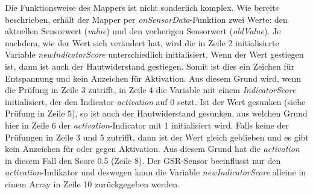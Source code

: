 Die Funktionsweise des Mappers ist nicht sonderlich komplex. Wie bereits beschrieben, erhält der Mapper per \textit{onSensorData}-Funktion zwei Werte: den aktuellen Sensorwert (\textit{value}) und den vorherigen Sensorwert (\textit{oldValue}). Je nachdem, wie der Wert sich verändert hat, wird die in Zeile 2 initialisierte Variable \textit{newIndicatorScore} unterschiedlich initialisiert. Wenn der Wert gestiegen ist, dann ist auch der Hautwiderstand gestiegen. Somit ist dies ein Zeichen für Entspannung und kein Anzeichen für Aktivation. Aus diesem Grund wird, wenn die Prüfung in Zeile 3 zutrifft, in Zeile 4 die Variable mit einem \textit{IndicatorScore} initialisiert, der den Indicator \textit{activation} auf 0 setzt. Ist der Wert gesunken (siehe Prüfung in Zeile 5), so ist auch der Hautwiderstand gesunken, aus welchen Grund hier in Zeile 6 der \textit{activation}-Indicator mit 1 initialisiert wird. Falls keine der Prüfungen in Zeile 3 und 5 zutrifft, dann ist der Wert gleich geblieben und es gibt kein Anzeichen für oder gegen Aktivation. Aus diesem Grund hat die \textit{activation} in diesem Fall den Score 0.5 (Zeile 8). Der GSR-Sensor beeinflusst nur den \textit{activation}-Indikator und deswegen kann die Variable \textit{newIndicatorScore} alleine in einem Array in Zeile 10 zurückgegeben werden. 
